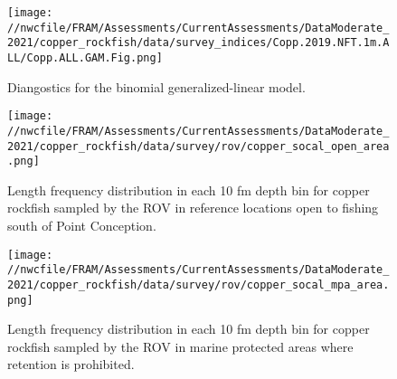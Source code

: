 \documentclass[11pt,
  english,
  a4paper,
]{article}
\begin{document}
\tagmcend\tagstructend


\begin{figure}
\centering
\texttt{[image: //nwcfile/FRAM/Assessments/CurrentAssessments/DataModerate\_2021/copper\_rockfish/data/survey\_indices/Copp.2019.NFT.1m.ALL/Copp.ALL.GAM.Fig.png]}
\caption{Diangostics for the binomial generalized-linear model.\label{fig:hkl-diag}}
\end{figure}

\tagmcend\tagstructend


\begin{figure}
\centering
\texttt{[image: //nwcfile/FRAM/Assessments/CurrentAssessments/DataModerate\_2021/copper\_rockfish/data/survey/rov/copper\_socal\_open\_area.png]}
\caption{Length frequency distribution in each 10 fm depth bin for copper rockfish sampled by the ROV in reference locations open to fishing south of Point Conception.\label{fig:rov-open}}
\end{figure}

\tagmcend\tagstructend


\begin{figure}
\centering
\texttt{[image: //nwcfile/FRAM/Assessments/CurrentAssessments/DataModerate\_2021/copper\_rockfish/data/survey/rov/copper\_socal\_mpa\_area.png]}
\caption{Length frequency distribution in each 10 fm depth bin for copper rockfish sampled by the ROV in marine protected areas where retention is prohibited.\label{fig:rov-mpa}}
\end{figure}

\tagmcend\tagstructend

\end{document}
